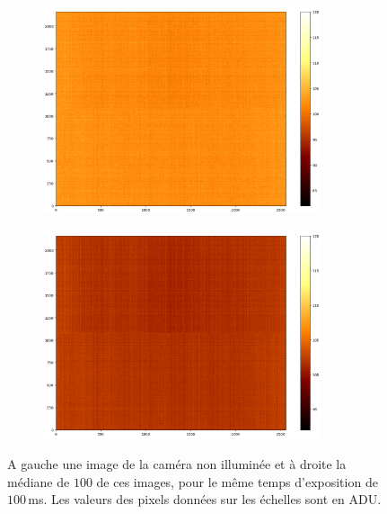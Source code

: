 \begin{figure}[ht!]
    \begin{subfigure}{.5\textwidth}
        \centering
        \includegraphics[width=0.9\textwidth]{Figure_Chap3/20220705_DarkFullImage_100ms_24C_Im0.png}
    \end{subfigure}%
    \begin{subfigure}{.5\textwidth}
        \centering
        \includegraphics[width=0.9\textwidth]{Figure_Chap3/20220705_DarkFullImage_100ms_24C_median.png}
    \end{subfigure}
    \caption[Images du courant d'obscurité de la caméra de FIRSTv2.]{A gauche une image de la caméra non illuminée et à droite la médiane de $100$ de ces images, pour le même temps d'exposition de $100 \,$ms. Les valeurs des pixels données sur les échelles sont en \ac{ADU}.}
    \label{fig:DarkFull}
\end{figure}


